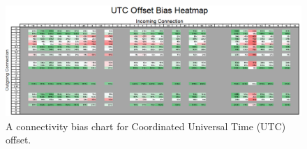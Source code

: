 \begin{figure}[t]
 \centering
 \includegraphics[bb=0 0 840 315,scale=.5]{./images/utc_offset.png}
 \caption{A connectivity bias chart for Coordinated Universal Time (UTC) offset.}
 \label{fig:utc_offset}
\end{figure}